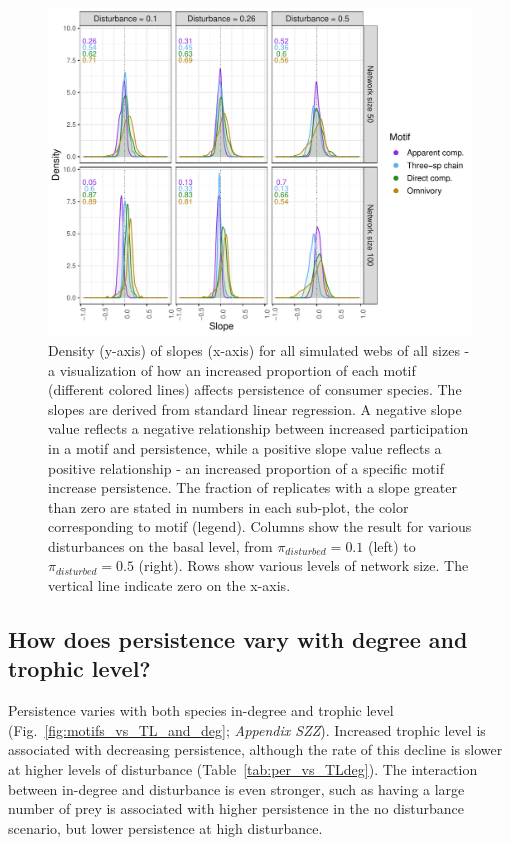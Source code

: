 \documentclass[12pt]{article}
\begin{document}
\begin{spacing}{2.0}
        \begin{figure}[h!]
             \centering
             \includegraphics[width=\textwidth]{figures/prop_dens_bp_vs_S_allC.pdf}
            \caption{Density (y-axis) of slopes (x-axis) for all simulated webs of all sizes - a visualization of how an increased proportion of each motif (different colored lines) affects persistence of consumer species. The slopes are derived from standard linear regression. A negative slope value reflects a negative relationship between increased participation in a motif and persistence, while a positive slope value reflects a positive relationship - an increased proportion of a specific motif increase persistence. The fraction of replicates with a slope greater than zero are stated in numbers in each sub-plot, the color corresponding to motif (legend). Columns show the result for various disturbances on the basal level, from $\pi_{disturbed} = 0.1$ (left) to $\pi_{disturbed} = 0.5$ (right). Rows show various levels of network size. The vertical line indicate zero on the x-axis.}
            \label{fig:density_prop_S}
        \end{figure}    
    
    \clearpage
    
    \subsection*{How does persistence vary with degree and trophic level?}
    
        Persistence varies with both species in-degree and trophic level (Fig.~\ref{fig:motifs_vs_TL_and_deg}; \emph{Appendix SZZ}). Increased trophic level is associated with decreasing persistence, although the rate of this decline is slower at higher levels of disturbance (Table~\ref{tab:per_vs_TLdeg}).
        The interaction between in-degree and disturbance is even stronger, such as having a large number of prey is associated with higher persistence in the no disturbance scenario, but lower persistence at high disturbance.
        

\end{spacing}
\end{document}
